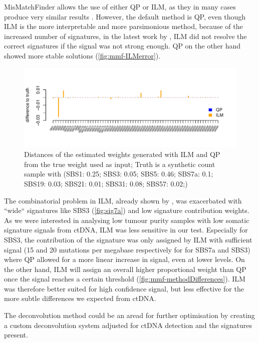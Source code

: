 MisMatchFinder allows the use of either QP or ILM, as they in many cases produce very similar results \cite{Lynch2016}. However, the default method is QP, even though ILM is the more interpretable and  more parsimonious method, because of the increased number of signatures, in the latest work by \textcite{Alexandrov2020}, ILM did not resolve the correct signatures if the signal was not strong enough. QP on the other hand showed more stable solutions (\autoref{fig:mmf-ILMerror}).

\begin{figure}[!ht]
\centering
\includegraphics[width=.99\linewidth]{Figures/MisMatchFinder/lowInputSignalDeconv.pdf}
\caption[Distance of deconvolution methods from truth]{Distances of the estimated weights generated with ILM and QP from the true weight used as input; Truth is a synthetic count sample with (SBS1: 0.25; SBS3: 0.05; SBS5: 0.46; SBS7a: 0.1; SBS19: 0.03; SBS21: 0.01; SBS31: 0.08; SBS57: 0.02;)}\label{fig:mmf-ILMerror}
\end{figure}
 
The combinatorial problem in ILM, already shown by \textcite{Lynch2016}, was exacerbated  with ``wide`` signatures like SBS3 (\autoref{fig:sig7a}) and low signature contribution weights. As we were interested in analysing low tumour purity samples with low somatic signature signals from ctDNA, ILM was less sensitive in our test. Especially for SBS3, the contribution of the signature was only assigned by ILM with sufficient signal (15 and 20 mutations per megabase respectively for for SBS7a and SBS3) where QP allowed for a more linear increase in signal, even at lower levels. On the other hand, ILM will assign an overall higher proportional weight than QP once the signal reaches a certain threshold (\autoref{fig:mmf-methodDifferences}). ILM was therefore better suited for high confidence signal, but less effective for the more subtle differences we expected from ctDNA.

The deconvolution method could be an aread for further optimisation by creating a custom deconvolution system adjusted for ctDNA detection and the signatures present.

